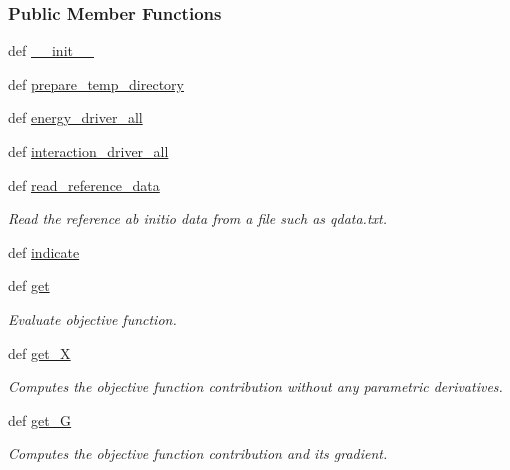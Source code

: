 \subsubsection*{Public Member Functions}
\begin{DoxyCompactItemize}
\item 
def \hyperlink{classforcebalance_1_1openmmio_1_1Interaction__OpenMM_a6ee56006edfbdcbb64eff468f819e2b1}{\-\_\-\-\_\-init\-\_\-\-\_\-}
\item 
def \hyperlink{classforcebalance_1_1openmmio_1_1Interaction__OpenMM_ae06c899ef79d1f65b27194d5826bf87b}{prepare\-\_\-temp\-\_\-directory}
\item 
def \hyperlink{classforcebalance_1_1openmmio_1_1Interaction__OpenMM_a535ff72686dc66b91f5dda007e252189}{energy\-\_\-driver\-\_\-all}
\item 
def \hyperlink{classforcebalance_1_1openmmio_1_1Interaction__OpenMM_a9813c1a24af88156703d05ebe57bf707}{interaction\-\_\-driver\-\_\-all}
\item 
def \hyperlink{classforcebalance_1_1interaction_1_1Interaction_aa67c082c3b6fa2d87ba3f4cf1a74e4f8}{read\-\_\-reference\-\_\-data}
\begin{DoxyCompactList}\small\item\em Read the reference ab initio data from a file such as qdata.\-txt. \end{DoxyCompactList}\item 
def \hyperlink{classforcebalance_1_1interaction_1_1Interaction_a91f94b978b73dd886035dcdb96b53cc1}{indicate}
\item 
def \hyperlink{classforcebalance_1_1interaction_1_1Interaction_a9fc3a40eb2852241ea440af719f6cf29}{get}
\begin{DoxyCompactList}\small\item\em Evaluate objective function. \end{DoxyCompactList}\item 
def \hyperlink{classforcebalance_1_1target_1_1Target_a606dd136f195c267c05a2455405e5949}{get\-\_\-\-X}
\begin{DoxyCompactList}\small\item\em Computes the objective function contribution without any parametric derivatives. \end{DoxyCompactList}\item 
def \hyperlink{classforcebalance_1_1target_1_1Target_afa8cc38c8bba8861c072e789717aa049}{get\-\_\-\-G}
\begin{DoxyCompactList}\small\item\em Computes the objective function contribution and its gradient. \end{DoxyCompactList}\item 

\end{DoxyCompactItemize}
